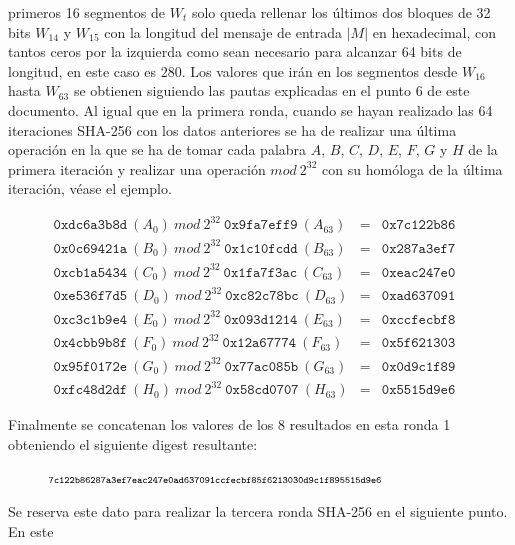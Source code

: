 \documentclass{article}
\begin{document}
    \noindent primeros 16 segmentos de $W_{t}$ solo queda rellenar los últimos dos bloques de 32 bits $W_{14}$ y $W_{15}$ con la longitud del mensaje de entrada $|M|$ en hexadecimal, con tantos ceros por la izquierda como sean necesario para alcanzar 64 bits de longitud, en este caso es $280$. Los valores que irán en los segmentos desde $W_{16}$ hasta $W_{63}$ se obtienen siguiendo las pautas explicadas en el punto 6 de este documento. Al igual que en la primera ronda, cuando se hayan realizado las 64 iteraciones SHA-256 con los datos anteriores se ha de realizar una última operación en la que se ha de tomar cada palabra $A$, $B$, $C$, $D$, $E$, $F$, $G$ y $H$ de la primera iteración y realizar  una operación $mod\ 2^{32}$ con su homóloga de la última iteración, véase el ejemplo.
    
    \begin{figure}[H]
    \centering
        $\begin{array}{lll}
            \texttt{0xdc6a3b8d}\ (A_0)\ mod\ 2^{32}\ \texttt{0x9fa7eff9}\ (A_63) & = & \texttt{0x7c122b86} \\
            \texttt{0x0c69421a}\ (B_0)\ mod\ 2^{32}\ \texttt{0x1c10fcdd}\ (B_63) & = & \texttt{0x287a3ef7} \\
            \texttt{0xcb1a5434}\ (C_0)\ mod\ 2^{32}\ \texttt{0x1fa7f3ac}\ (C_63) & = & \texttt{0xeac247e0} \\
            \texttt{0xe536f7d5}\ (D_0)\ mod\ 2^{32}\ \texttt{0xc82c78bc}\ (D_63) & = & \texttt{0xad637091} \\
            \texttt{0xc3c1b9e4}\ (E_0)\ mod\ 2^{32}\ \texttt{0x093d1214}\ (E_63) & = & \texttt{0xccfecbf8} \\
            \texttt{0x4cbb9b8f}\ (F_0)\ mod\ 2^{32}\ \texttt{0x12a67774}\ (F_63) & = & \texttt{0x5f621303} \\
            \texttt{0x95f0172e}\ (G_0)\ mod\ 2^{32}\ \texttt{0x77ac085b}\ (G_63) & = & \texttt{0x0d9c1f89} \\
            \texttt{0xfc48d2df}\ (H_0)\ mod\ 2^{32}\ \texttt{0x58cd0707}\ (H_63) & = & \texttt{0x5515d9e6}
        \end{array}$
    \end{figure}
    
    Finalmente se concatenan los valores de los 8 resultados en esta ronda 1 obteniendo el siguiente digest resultante:
    
    \begin{figure}[H]
    \centering
        $\scriptsize{\texttt{7c122b86287a3ef7eac247e0ad637091ccfecbf85f6213030d9c1f895515d9e6}}$
    \end{figure}
    Se reserva este dato para realizar la tercera ronda SHA-256 en el siguiente punto. En este
    
\end{document}
